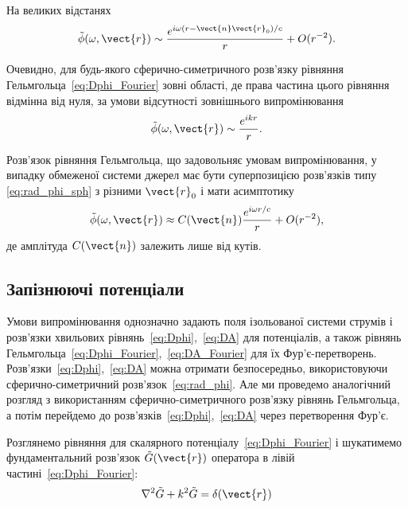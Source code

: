 На великих відстанях
\begin{equation*}
	\tilde{\phi} (\omega, \vect{r}) \sim \frac{e^{i\omega (r - \vect{n} \vect{r}_0)/c}}{r} + O(r^{-2}).
\end{equation*}

Очевидно, для будь-якого сферично-симетричного розв’язку рівняння Гельмгольца~\eqref{eq:Dphi_Fourier} зовні області, де права частина цього рівняння
відмінна від нуля, за
умови відсутності зовнішнього випромінювання
\begin{equation}\label{eq:rad_phi_sph}
	\tilde{\phi} (\omega, \vect{r}) \sim \frac{e^{ikr}}{r}.
\end{equation}

Розв’язок рівняння Гельмгольца, що задовольняє умовам випромінювання, у випадку обмеженої системи джерел має бути суперпозицією розв’язків типу
\eqref{eq:rad_phi_sph} з
різними $\vect{r}_0$ і мати асимптотику
\begin{equation*}
	\tilde{\phi} (\omega, \vect{r}) \approx C(\vect{n}) \frac{e^{i\omega r / c}}{r} + O(r^{-2}),
\end{equation*}
де амплітуда $C(\vect{n}) $ залежить лише від кутів.


\subsection*{Запізнюючі потенціали}


Умови випромінювання однозначно задають поля ізольованої системи струмів і розв’язки хвильових рівнянь~\eqref{eq:Dphi},~\eqref{eq:DA} для потенціалів, а
також рівнянь
Гельмгольца~\eqref{eq:Dphi_Fourier},~\eqref{eq:DA_Fourier} для їх Фур’є-перетворень. Розв’язки~\eqref{eq:Dphi},~\eqref{eq:DA} можна отримати
безпосередньо,
використовуючи сферично-симетричний
розв’язок~\eqref{eq:rad_phi}. Але ми проведемо аналогічний розгляд з використанням сферично-симетричного розв’язку рівнянь Гельмгольца, а потім
перейдемо до
розв’язків~\eqref{eq:Dphi},~\eqref{eq:DA} через перетворення Фур’є.

Розглянемо рівняння для скалярного потенціалу~\eqref{eq:Dphi_Fourier} і шукатимемо
фундаментальний
розв’язок $\tilde{G}(\vect{r})$
оператора в лівій частині~\eqref{eq:Dphi_Fourier}:
\begin{equation*}
	\nabla^2\tilde{G} + k^2\tilde{G} = \delta(\vect{r})
\end{equation*}

